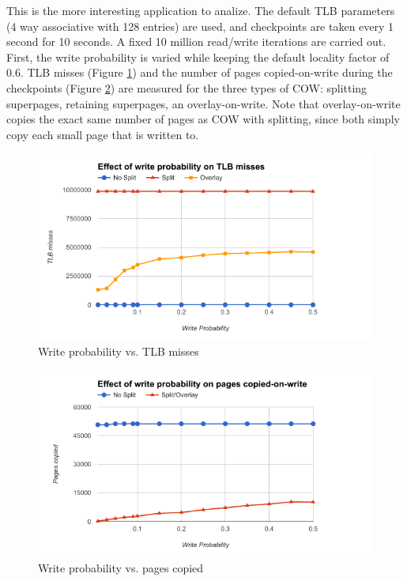 This is the more interesting application to analize. The default TLB parameters (4 way associative with 128 entries) are used, and checkpoints are taken every 1 second for 10 seconds. A fixed 10 million read/write iterations are carried out. First, the write probability is varied while keeping the default locality factor of $0.6$. TLB misses (Figure \ref{fig:write_prob_misses}) and the number of pages copied-on-write during the checkpoints (Figure \ref{fig:write_prob_copied}) are measured for the three types of COW: splitting superpages, retaining superpages, an overlay-on-write. Note that overlay-on-write copies the exact same number of pages as COW with splitting, since both simply copy each small page that is written to.
\begin{figure}
    \centering
    \includegraphics[width=6in]{Figures/write_prob_tlb}
    \caption{Write probability vs. TLB misses}
    \label{fig:write_prob_misses}
\end{figure}
\begin{figure}
    \centering
    \includegraphics[width=6in]{Figures/write_prob_copied}
    \caption{Write probability vs. pages copied}
    \label{fig:write_prob_copied}
\end{figure}

